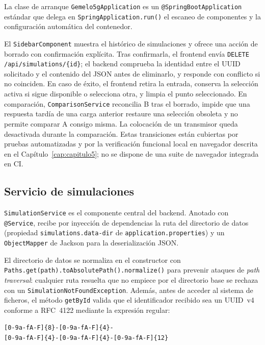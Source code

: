 La clase de arranque \texttt{Gemelo5gApplication} es un \texttt{@SpringBootApplication}
estándar que delega en \texttt{SpringApplication.run()} el escaneo de componentes y la
configuración automática del contenedor.

El \texttt{SidebarComponent} muestra el histórico de simulaciones y ofrece una acción de
borrado con confirmación explícita. Tras confirmarla, el frontend envía
\texttt{DELETE /api/simulations/\{id\}}; el backend comprueba la identidad entre el UUID
solicitado y el contenido del JSON antes de eliminarlo, y responde con conflicto si no
coinciden. En caso de éxito, el frontend retira la entrada, conserva la selección activa
si sigue disponible o selecciona otra, y limpia el punto seleccionado. En comparación,
\texttt{ComparisonService} reconcilia B tras el borrado, impide que una respuesta tardía
de una carga anterior restaure una selección obsoleta y no permite comparar A consigo
misma. La colocación de un transmisor queda desactivada durante la comparación. Estas
transiciones están cubiertas por pruebas automatizadas y por la verificación funcional
local en navegador descrita en el Capítulo~\ref{cap:capitulo5}; no se dispone de una suite
de navegador integrada en CI.

\subsection{Servicio de simulaciones}
\label{sec:backend_service}

\texttt{SimulationService} es el componente central del backend. Anotado con
\texttt{@Service}, recibe por inyección de dependencias la ruta del directorio de datos
(propiedad \texttt{simulations.data-dir} de \texttt{application.properties}) y un
\texttt{ObjectMapper} de Jackson para la deserialización JSON.

El directorio de datos se normaliza en el constructor con
\texttt{Paths.get(path).toAbsolutePath().normalize()} para prevenir ataques de
\textit{path traversal}: cualquier ruta resuelta que no empiece por el directorio base
se rechaza con un \texttt{SimulationNotFoundException}. Además, antes de acceder al
sistema de ficheros, el método \texttt{getById} valida que el identificador recibido
sea un UUID~v4 conforme a RFC~4122 mediante la expresión regular:

\begin{center}
\texttt{[0-9a-fA-F]\{8\}-[0-9a-fA-F]\{4\}-}\\
\texttt{[0-9a-fA-F]\{4\}-[0-9a-fA-F]\{4\}-[0-9a-fA-F]\{12\}}
\end{center}

